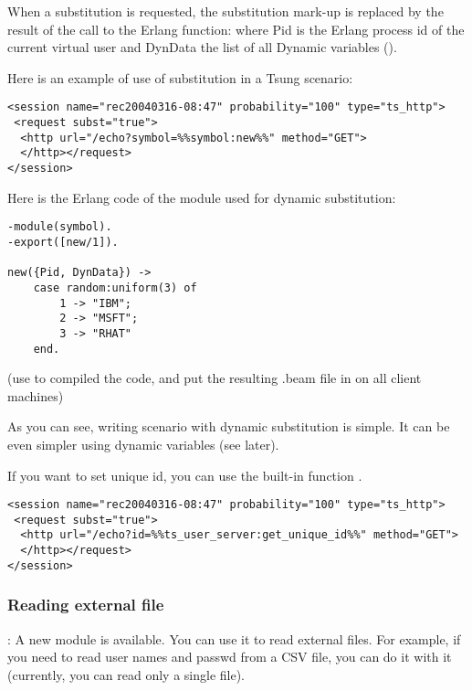 \documentclass{TSUNG-en}
\begin{document}
When a substitution is requested, the substitution mark-up is replaced by
the result of the call to the Erlang function:
 where Pid is the Erlang process
id of the current virtual user and DynData the list of all Dynamic
variables ().

Here is an example of use of substitution in a Tsung scenario:

\begin{Verbatim}
<session name="rec20040316-08:47" probability="100" type="ts_http">
 <request subst="true">
  <http url="/echo?symbol=%%symbol:new%%" method="GET">
  </http></request>
</session>
\end{Verbatim}

Here is the Erlang code of the module used for dynamic substitution:

\begin{Verbatim}
-module(symbol).
-export([new/1]).

new({Pid, DynData}) ->
    case random:uniform(3) of
        1 -> "IBM";
        2 -> "MSFT";
        3 -> "RHAT"
    end.
\end{Verbatim}

(use  to compiled the code, and put the resulting .beam
file in  on all client
machines)

As you can see, writing scenario with dynamic substitution is
simple. It can be even simpler using dynamic variables (see later).

If you want to set unique id, you can use the built-in function
.
\begin{Verbatim}
<session name="rec20040316-08:47" probability="100" type="ts_http">
 <request subst="true">
  <http url="/echo?id=%%ts_user_server:get_unique_id%%" method="GET">
  </http></request>
</session>
\end{Verbatim}

\subsubsection{Reading external file}
: A new  module  is available. You
can use it to read external files. For example, if you need to read user
names and passwd from a CSV file, you can do it with it (currently,
you can read only a single file).
\end{document}

